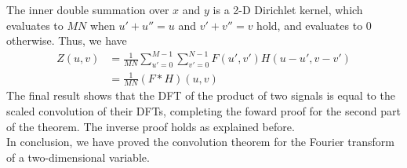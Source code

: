 \documentclass[UTF8]{ctexart}
\begin{document}
The inner double summation over \( x \) and \( y \) is a 2-D Dirichlet kernel, which evaluates to \( MN \) when \( u' + u'' = u \) and \( v' + v'' = v \) hold, and evaluates to 0 otherwise.
Thus, we have
\begin{equation*}
\begin{aligned}
Z(u,v) &= \frac{1}{MN} \sum_{u'=0}^{M-1} \sum_{v'=0}^{N-1} F(u', v') H(u - u', v - v') \\
&= \frac{1}{MN} (F * H)(u, v)
\end{aligned}
\end{equation*}
The final result shows that the DFT of the product of two signals is equal to the scaled convolution of their DFTs, completing the foward proof for the second part of the theorem.
The inverse proof holds as explained before.\\
In conclusion, we have proved the convolution theorem for the Fourier transform of a two-dimensional variable.
\end{document}
